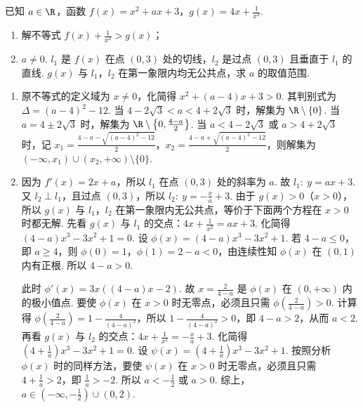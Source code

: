 \documentclass[UTF8,a4paper,oneside,11pt]{ctexbook}
\begin{document}
\begin{problem}
已知 \( a\in \R \)，函数 \( f(x)=x^2+ax+3 \)，\( g(x)=4x+\frac{1}{x^2} \).

\begin{enumerate}
\item 解不等式 \( f(x)+\frac{1}{x^2}>g(x) \)；
\item \( a\neq 0 \). \( l_1 \) 是 \( f(x) \) 在点 \( \left( 0,3 \right) \) 处的切线，\( l_2 \) 是过点 \( \left( 0,3 \right) \) 且垂直于 \( l_1 \) 的直线. \( g(x) \) 与 \( l_1 \)，\( l_2 \) 在第一象限内均无公共点，求 \( a \) 的取值范围.
\end{enumerate}
\end{problem}

\begin{solution}
\begin{enumerate}
\item 原不等式的定义域为 \( x\neq 0 \)，化简得 \( x^2+\left( a-4 \right)x+3>0 \). 其判别式为 \( \Delta=\left( a-4 \right)^2-12 \). 当 \( 4-2\sqrt{3}<a<4+2\sqrt{3} \) 时，解集为 \( \R\setminus\{0\} \). 当 \( a=4\pm2\sqrt{3} \) 时，解集为 \( \R\setminus\left\{ 0,\frac{4-a}{2} \right\} \). 当 \( a<4-2\sqrt{3} \) 或 \( a>4+2\sqrt{3} \) 时，记 \( x_1=\frac{4-a-\sqrt{\left( a-4 \right)^2-12}}{2} \)，\( x_2=\frac{4-a+\sqrt{\left( a-4 \right)^2-12}}{2} \)，则解集为 \( \left( -\infty,x_1 \right)\cup\left( x_2,+\infty \right)\setminus\{0\} \).

\item 因为 \( f'(x)=2x+a \)，所以 \( l_1 \) 在点 \( \left( 0,3 \right) \) 处的斜率为 \( a \). 故 \( l_1:\ y=ax+3 \). 又 \( l_2 \perp l_1 \)，且过点 \( \left( 0,3 \right) \)，所以 \( l_2:\ y=-\frac{x}{a}+3 \).
由于 \( g(x)>0 \)（\( x>0 \)），所以 \( g(x) \) 与 \( l_1 \)，\( l_2 \) 在第一象限内无公共点，等价于下面两个方程在 \( x>0 \) 时都无解.
先看 \( g(x) \) 与 \( l_1 \) 的交点：\( 4x+\frac{1}{x^2}=ax+3 \). 化简得 \( \left( 4-a \right)x^3-3x^2+1=0 \). 设 \( \phi(x)=\left( 4-a \right)x^3-3x^2+1 \).
若 \( 4-a\le 0 \)，即 \( a\ge 4 \)，则 \( \phi(0)=1 \)，\( \phi(1)=2-a<0 \)，由连续性知 \( \phi(x) \) 在 \( \left( 0,1 \right) \) 内有正根. 所以 \( 4-a>0 \).

此时 \( \phi'(x)=3x\left( \left( 4-a \right)x-2 \right) \). 故 \( x=\frac{2}{4-a} \) 是 \( \phi(x) \) 在 \( \left( 0,+\infty \right) \) 内的极小值点. 要使 \( \phi(x) \) 在 \( x>0 \) 时无零点，必须且只需 \( \phi\left( \frac{2}{4-a} \right)>0 \). 计算得 \( \phi\left( \frac{2}{4-a} \right)=1-\frac{4}{\left( 4-a \right)^2} \)，所以 \( 1-\frac{4}{\left( 4-a \right)^2}>0 \)，即 \( 4-a>2 \)，从而 \( a<2 \).
再看 \( g(x) \) 与 \( l_2 \) 的交点：\( 4x+\frac{1}{x^2}=-\frac{x}{a}+3 \). 化简得 \( \left( 4+\frac{1}{a} \right)x^3-3x^2+1=0 \). 设 \( \psi(x)=\left( 4+\frac{1}{a} \right)x^3-3x^2+1 \). 按照分析 \( \phi(x) \) 时的同样方法，要使 \( \psi(x) \) 在 \( x>0 \) 时无零点，必须且只需 \( 4+\frac{1}{a}>2 \)，即 \( \frac{1}{a}>-2 \). 所以 \( a<-\frac{1}{2} \) 或 \( a>0 \).
综上，\( a\in \left( -\infty,-\frac{1}{2} \right)\cup \left( 0,2 \right) \).
\end{enumerate}
\end{solution}
\end{document}
